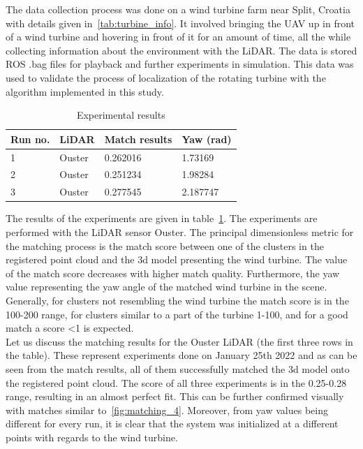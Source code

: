 The data collection process was done on a wind turbine farm near Split, Croatia with details given in~\ref{tab:turbine_info}. It involved bringing the UAV up in front of a wind turbine and hovering in front of it for an amount of time, all the while collecting information about the environment with the LiDAR. The data is stored ROS .bag files for playback and further experiments in simulation. This data was used to validate the process of localization of the rotating turbine with the algorithm implemented in this study.



\begin{table}[H]
    \centering
    \begin{tabularx}{0.48\textwidth}{||X|X|X|X||}
    \hline
     Run no. & LiDAR & Match results & Yaw (rad) \\
     \hline
    \hline
        1 & Ouster & 0.262016 & 1.73169\\
    \hline
        2 & Ouster & 0.251234 & 1.98284\\
    \hline
        3 & Ouster & 0.277545 & 2.187747\\
    \hline
    \end{tabularx}
    \caption{Experimental results}
    \label{tab:results}
\end{table}


The results of the experiments are given in table~\ref{tab:results}. The experiments are performed with the LiDAR sensor Ouster. The principal dimensionless metric for the matching process is the match score between one of the clusters in the registered point cloud and the 3d model presenting the wind turbine. The value of the match score decreases with higher match quality. Furthermore, the yaw value representing the yaw angle of the matched wind turbine in the scene. Generally, for clusters not resembling the wind turbine the match score is in the 100-200 range, for clusters similar to a part of the turbine 1-100, and for a good match a score <1 is expected. \\
Let us discuss the matching results for the Ouster LiDAR (the first three rows in the table). These represent experiments done on January 25th 2022 and as can be seen from the match results, all of them successfully matched the 3d model onto the registered point cloud. The score of all three experiments is in the 0.25-0.28 range, resulting in an almost perfect fit. This can be further confirmed visually with matches similar to~\ref{fig:matching_4}. Moreover, from yaw values being different for every run, it is clear that the system was initialized at a different points with regards to the wind turbine.\\ 

